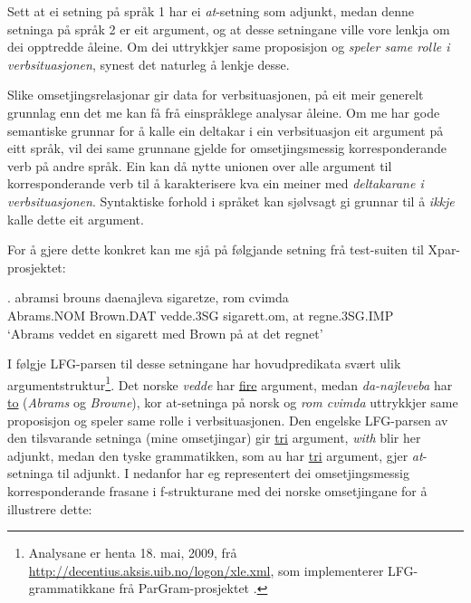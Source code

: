 \documentclass[11pt,a4paper,oneside,draft]{book}
\begin{document}
Sett at ei setning på språk 1 har ei \emph{at}-setning som adjunkt, medan
denne setninga på språk 2 er eit argument, og at desse setningane
ville vore lenkja om dei opptredde åleine. Om dei uttrykkjer same
proposisjon og \emph{speler same rolle i verbsituasjonen}, synest det
naturleg å lenkje desse.

Slike omsetjingsrelasjonar gir data for verbsituasjonen, på eit meir
generelt grunnlag enn det me kan få frå einspråklege analysar
åleine. Om me har gode semantiske grunnar for å kalle ein deltakar i
ein verbsituasjon eit argument på eitt språk, vil dei same grunnane
gjelde for omsetjingsmessig korresponderande verb på andre språk. Ein
kan då nytte unionen over alle argument til korresponderande verb til
å karakterisere kva ein meiner med \emph{deltakarane i verbsituasjonen}. Syntaktiske forhold i språket kan sjølvsagt gi
grunnar til å \emph{ikkje} kalle dette eit argument.

For å gjere dette konkret kan me sjå på følgjande setning frå
test-suiten til Xpar-prosjektet:

\exg. abramsi brouns       daenajleva sigaretze, rom cvimda \label{ex:vedde-gloss} \\
      Abrams.NOM Brown.DAT vedde.3SG sigarett.om, at  regne.3SG.IMP \\
     `Abrams veddet en sigarett med Brown på at det regnet' 

I følgje LFG-parsen til desse setningane har hovudpredikata svært ulik
argumentstruktur\footnote{Analysane er henta 18. mai, 2009, frå
        \href{http://decentius.aksis.uib.no/logon/xle.xml}{http://decentius.aksis.uib.no/logon/xle.xml}, som implementerer
        LFG-grammatikkane frå ParGram-prosjektet \citep{butt2002pgp}. }. Det norske \emph{vedde} har \underline{fire} argument, medan
\emph{da-najleveba} har \underline{to} (\emph{Abrams} og \emph{Browne}), kor at-setninga på
norsk og \emph{rom cvimda} uttrykkjer same proposisjon og speler same rolle
i verbsituasjonen. Den engelske LFG-parsen av den tilsvarande setninga
(mine omsetjingar) gir \underline{tri} argument, \emph{with} blir her adjunkt, medan
den tyske grammatikken, som au har \underline{tri} argument, gjer \emph{at}-setninga
til adjunkt. I \Next nedanfor har eg representert dei omsetjingsmessig
korresponderande frasane i f-strukturane med dei norske omsetjingane
for å illustrere dette:
\end{document}
